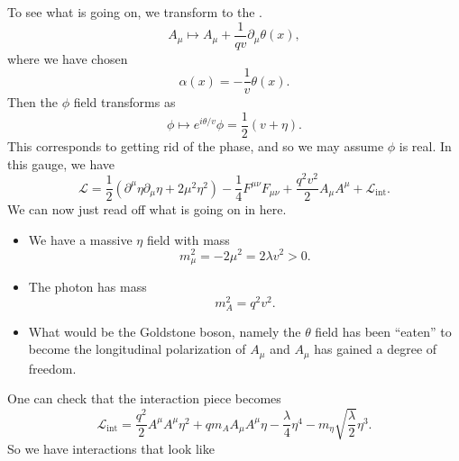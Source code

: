 \documentclass[a4paper]{article}
\begin{document}
To see what is going on, we transform to the .
\[
  A_\mu \mapsto A_\mu + \frac{1}{qv} \partial_\mu \theta(x),
\]
where we have chosen
\[
  \alpha(x) = - \frac{1}{v} \theta(x).
\]
Then the $\phi$ field transforms as
\[
  \phi \mapsto e^{i\theta/v} \phi = \frac{1}{2} (v + \eta).
\]
This corresponds to getting rid of the phase, and so we may assume $\phi$ is real. In this gauge, we have
\[
  \mathcal{L} = \frac{1}{2}(\partial^\mu \eta \partial_\mu \eta + 2 \mu^2 \eta^2) - \frac{1}{4} F^{\mu\nu}F_{\mu\nu} + \frac{q^2 v^2}{2} A_\mu A^\mu  + \mathcal{L}_{\mathrm{int}}.
\]
We can now just read off what is going on in here.
\begin{itemize}
  \item We have a massive $\eta$ field with mass
    \[
      m_\mu^2 = - 2 \mu^2 = 2 \lambda v^2 > 0.
    \]
  \item The photon has mass
    \[
      m_A^2 = q^2 v^2.
    \]
  \item What would be the Goldstone boson, namely the $\theta$ field has been ``eaten'' to become the longitudinal polarization of $A_\mu$ and $A_\mu$ has gained a degree of freedom.
\end{itemize}
One can check that the interaction piece becomes
\[
  \mathcal{L}_{\mathrm{int}} = \frac{q^2}{2} A^\mu A^\mu \eta^2 + q m_A A_\mu A^\mu \eta - \frac{\lambda}{4} \eta^4 - m_\eta \sqrt{\frac{\lambda}{2}} \eta^3.
\]
So we have interactions that look like
\end{document}
